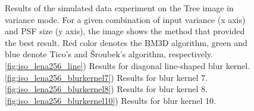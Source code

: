 \documentclass[12pt,notitlepage]{report}
\begin{document}
\begin{figure}[h]
  \caption[Simulated-data experiment on the Tree image in variance mode]{Results of the simulated data experiment on the Tree image in variance mode. For a given combination of input variance (x axis) and PSF size (y axis), the image shows the method that provided the best result. Red color denotes the BM3D algorithm, green and blue denote Tico's and Šroubek's algorithm, respectively. \ref{fig:iso_lena256_line}) Results for diagonal line-shaped blur kernel. \ref{fig:iso_lena256_blurkernel7}) Results for blur kernel 7. \ref{fig:iso_lena256_blurkernel8}) Results for blur kernel 8. \ref{fig:iso_lena256_blurkernel10}) Results for blur kernel 10.}
  \label{fig:var_tree256}
\end{figure}

\clearpage
\end{document}
